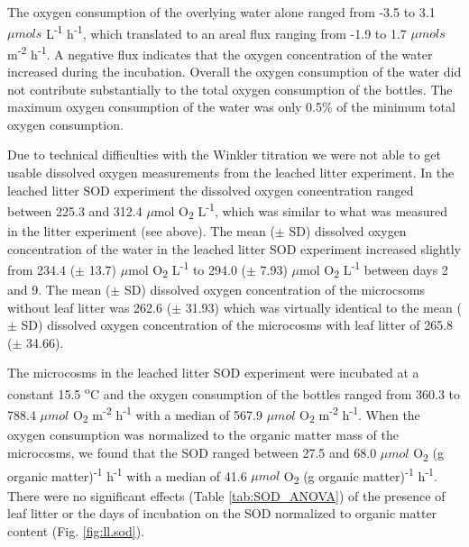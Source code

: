 The oxygen consumption of the overlying water alone ranged from -3.5 to 3.1 $\mu mols$ L\textsuperscript{-1} h\textsuperscript{-1}, which translated to an areal flux ranging from -1.9 to 1.7 $\mu mols$ m\textsuperscript{-2} h\textsuperscript{-1}. A negative flux indicates that the oxygen concentration of the water increased during the incubation. Overall the oxygen consumption of the water did not contribute substantially to the total oxygen consumption of the bottles. The maximum oxygen consumption of the water was only 0.5\% of the minimum total oxygen consumption.  

Due to technical difficulties with the Winkler titration we were not able to get usable dissolved oxygen measurements from the leached litter experiment. In the leached litter SOD experiment the dissolved oxygen concentration ranged between 225.3 and 312.4 $\mu$mol O\textsubscript{2} L\textsuperscript{-1}, which was similar to what was measured in the litter experiment (see above). The mean ($\pm$ SD) dissolved oxygen concentration of the water in the leached litter SOD experiment increased slightly from 234.4 ($\pm$ 13.7) $\mu$mol O\textsubscript{2} L\textsuperscript{-1} to 294.0 ($\pm$ 7.93) $\mu$mol O\textsubscript{2} L\textsuperscript{-1} between days 2 and 9.  The mean ($\pm$ SD) dissolved oxygen concentration of the  microcsoms without leaf litter was 262.6 ($\pm$ 31.93) which was virtually identical to the mean ($\pm$ SD) dissolved oxygen concentration of the microcosms with leaf litter of 265.8 ($\pm$ 34.66). 

The microcosms in the leached litter SOD experiment were incubated at a constant 15.5 \textsuperscript{o}C and the oxygen consumption of the bottles ranged from 360.3 to 788.4 $\mu mol$ O\textsubscript{2} m\textsuperscript{-2} h\textsuperscript{-1} with a median of 567.9 $\mu mol$ O\textsubscript{2} m\textsuperscript{-2} h\textsuperscript{-1}. When the oxygen consumption was normalized to the organic matter mass of the microcosms, we found that the SOD ranged between 27.5 and 68.0 $\mu mol$ O\textsubscript{2} (g organic matter)\textsuperscript{-1} h\textsuperscript{-1} with a median of 41.6 $\mu mol$ O\textsubscript{2} (g organic matter)\textsuperscript{-1} h\textsuperscript{-1}. There were no significant effects (Table \ref{tab:SOD_ANOVA}) of the presence of leaf litter or the days of incubation on the SOD normalized to organic matter content (Fig. \ref{fig:ll.sod}).